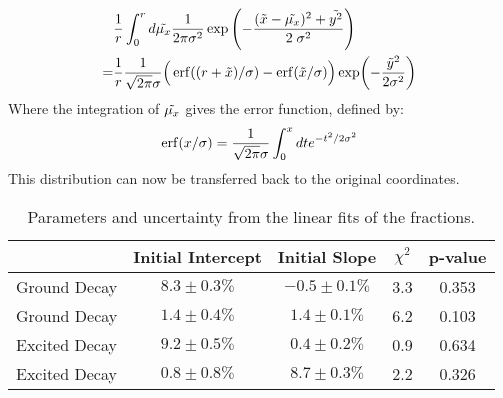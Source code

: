 \begin{align}
    &\frac{1}{r} \int_0^r d\Tilde{\mu_x} \frac{1}{2 \pi \sigma^2} \exp \left(- \frac{(\Tilde{x} - \Tilde{\mu_x})^2 + \Tilde{y^2}}{2 \; \sigma^2} \right) \\
    = &\frac{1}{r}\frac{1}{\sqrt{2 \pi} \sigma} \Big(\erf((r + \Tilde{x}) / \sigma) - \erf(\Tilde{x} / \sigma)\Big) \exp(-\frac{\Tilde{y}^2}{2 \sigma^2})
\end{align}
Where the integration of $\Tilde{\mu_x}$ gives the error function, defined by: 
\begin{equation}
    \erf(x/\sigma) = \frac{1}{\sqrt{2 \pi }\sigma} \int_0^x dt e^{-t^2/2\sigma^2}
\end{equation}
This distribution can now be transferred back to the original coordinates. 




\begin{table}[h]
\centering
\begin{tabular}{l|c|c|c|c}
 & Initial Intercept & Initial Slope & $\chi^2$ & p-value \\
\hline
Ground Decay & $8.3 \pm 0.3 \%$ & $-0.5 \pm 0.1 \%$ & 3.3 & 0.353 \\
Ground Decay & $1.4 \pm 0.4 \%$ & $1.4 \pm 0.1 \%$ & 6.2 & 0.103 \\
Excited Decay & $9.2 \pm 0.5 \%$ & $0.4 \pm 0.2 \%$ & 0.9 & 0.634 \\
Excited Decay & $0.8 \pm 0.8 \%$ & $8.7 \pm 0.3 \%$ & 2.2 & 0.326 \\
\end{tabular}
\caption{Parameters and uncertainty from the linear fits of the fractions. }
\label{tab:experiment_results}
\end{table}
